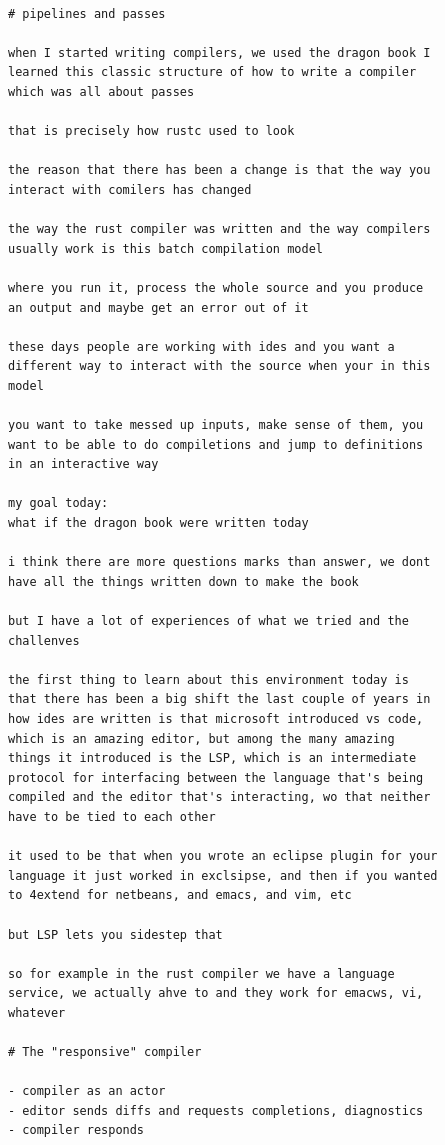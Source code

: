 \documentclass[12pt, a4paper]{report}
\begin{document}
\begin{Verbatim}[fontsize=\small]

# pipelines and passes

when I started writing compilers, we used the dragon book I
learned this classic structure of how to write a compiler
which was all about passes

that is precisely how rustc used to look

the reason that there has been a change is that the way you
interact with comilers has changed

the way the rust compiler was written and the way compilers
usually work is this batch compilation model

where you run it, process the whole source and you produce
an output and maybe get an error out of it

these days people are working with ides and you want a
different way to interact with the source when your in this
model

you want to take messed up inputs, make sense of them, you
want to be able to do compiletions and jump to definitions
in an interactive way

my goal today:
what if the dragon book were written today

i think there are more questions marks than answer, we dont
have all the things written down to make the book

but I have a lot of experiences of what we tried and the
challenves

the first thing to learn about this environment today is
that there has been a big shift the last couple of years in
how ides are written is that microsoft introduced vs code,
which is an amazing editor, but among the many amazing
things it introduced is the LSP, which is an intermediate
protocol for interfacing between the language that's being
compiled and the editor that's interacting, wo that neither
have to be tied to each other

it used to be that when you wrote an eclipse plugin for your
language it just worked in exclsipse, and then if you wanted
to 4extend for netbeans, and emacs, and vim, etc

but LSP lets you sidestep that

so for example in the rust compiler we have a language
service, we actually ahve to and they work for emacws, vi,
whatever

# The "responsive" compiler

- compiler as an actor
- editor sends diffs and requests completions, diagnostics
- compiler responds


\end{Verbatim}
\end{document}
